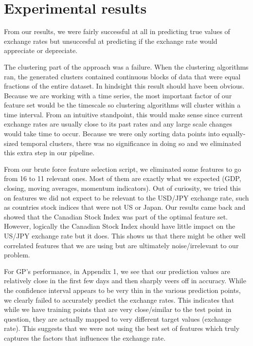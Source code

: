 \documentclass[twoside]{article}
\begin{document}

\section{Experimental results}

From our results, we were fairly successful at all in predicting true values of exchange rates but unsuccesful at predicting if the exchange rate would appreciate or depreciate.

The clustering part of the approach was a failure. When the clustering algorithms ran, the generated clusters contained continuous blocks of data that were equal fractions of the entire dataset. In hindsight this result should have been obvious. Because we are working with a time series, the most important factor of our feature set would be the timescale so clustering algorithms will cluster within a time interval. From an intuitive standpoint, this would make sense since current exchange rates are usually close to its past rates and any large scale changes would take time to occur. Because we were only sorting data points into equally-sized temporal clusters, there was no significance in doing so and we eliminated this extra step in our pipeline.

From our brute force feature selection script, we eliminated some features to go from 16 to 11 relevant ones. Most of them are exactly what we expected (GDP, closing, moving averages, momentum indicators). Out of curiosity, we tried this on features we did not expect to be relevant to the USD/JPY exchange rate, such as countries stock indices that were not US or Japan. Our results came back and showed that the Canadian Stock Index was part of the optimal feature set. However, logically the Canadian Stock Index should have little impact on the US/JPY exchange rate but it does. This shows us that there might be other well correlated features that we are using but are ultimately noise/irrelevant to our problem.

For GP’s performance, in Appendix 1, we see that our prediction values are relatively close in the first few days and then sharply veers off in accuracy. While the confidence interval appears to be very thin in the various prediction points, we clearly failed to accurately predict the exchange rates. This indicates that while we have training points that are very close/similar to the test point in question, they are actually mapped to very different target values (exchange rate). This suggests that we were not using the best set of features which truly captures the factors that influences the exchange rate.
\end{document}
